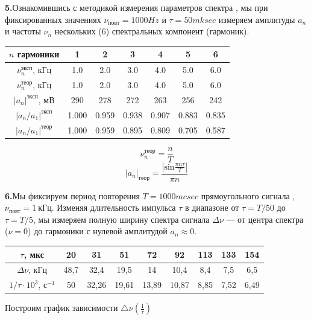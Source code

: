\documentclass[a4paper]{article}
\begin{document}
\newpage

\textbf{5.}Ознакомившись с методикой измерения параметров спектра , 
мы при фиксированных значениях $\nu_{\text{повт}} = 1000 Hz$ и $\tau = 50 mksec $  
измеряем амплитуды $a_n$ и частоты $\nu_n$ нескольких (6) спектральных компонент (гармоник).

\begin{table}[!h]
\centering
\begin{tabular}{|c|c|c|c|c|c|c|}
\hline
$n$ гармоники & 1 & 2 & 3 & 4 & 5 & 6 \\
\hline
$\nu_n^{\text{эксп}}$, кГц & 1.0 & 2.0 & 3.0 & 4.0 & 5.0 & 6.0 \\
\hline
$\nu_n^{\text{теор}}$, кГц & 1.0 & 2.0 & 3.0 & 4.0 & 5.0 & 6.0 \\
\hline
$|a_n|^{\text{эксп}}$, мВ & 290 & 278 & 272 & 263 & 256 & 242 \\
\hline
$|a_n/a_1|^{\text{эксп}}$ & 1.000 & 0.959 & 0.938 & 0.907 & 0.883 & 0.835 \\
\hline
$|a_n/a_1|^{\text{теор}}$ & 1.000 & 0.959 & 0.895 & 0.809 & 0.705 & 0.587 \\
\hline
\end{tabular}
\end{table}

$$\nu_n^\text{теор} = \frac{n}{T}$$
$$|a_n|_\text{теор} = \frac{|\text{sin}\frac{\pi n \tau}{T}|}{\pi n}$$


\newpage

\textbf{6.}Мы фиксируем период повторения $T = 1000 mcsec$ прямоугольного сигнала , $\nu_{\text{повт}} = 1~\text{кГц}$. 
Изменяя длительность импульса $\tau$ в диапазоне от $\tau = T/50$ до $\tau = T/5$, 
мы измеряем полную ширину спектра сигнала $\Delta\nu$ — от центра спектра ($\nu = 0$) до гармоники с нулевой амплитудой $a_n \approx 0$.

\begin{table}[h!]
    \centering
    \begin{tabular}{|c|c|c|c|c|c|c|c|c|}
\hline
$\tau$, мкс & 20 & 31 & 51 & 72 & 92 & 113 & 133 & 154 \\ \hline
$\Delta \nu$, кГц & 48,7 & 32,4 & 19,5 & 14 & 10,4 & 8,4 & 7,5 & 6,5 \\ \hline
$1/\tau \cdot 10^3$, с$^{-1}$ & 50 &  32,26& 19,61 &13,89  &10,87  &8,85  &7,52  &6,49 \\ \hline
\end{tabular}
\end{table}

Построим график зависимости  $\bigtriangleup \nu  (\frac{1}{\tau })$
\end{document}
